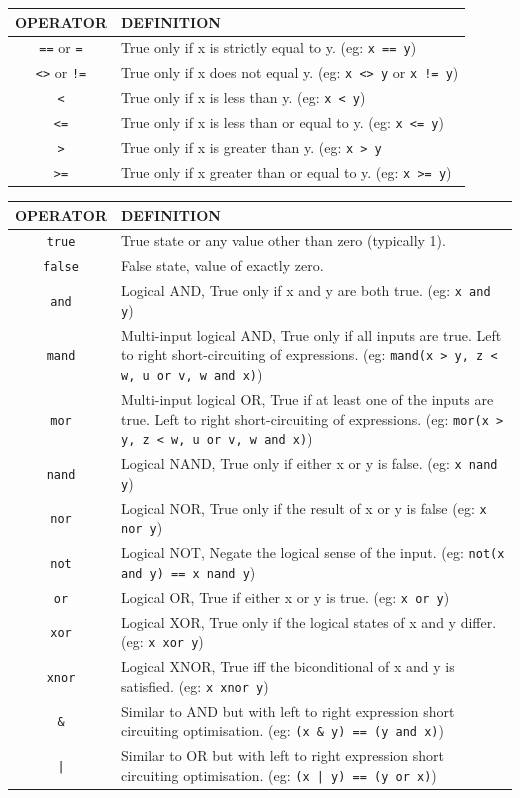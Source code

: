 \documentclass{book}
\def\lthtmlcheckvsize{\ifdim\ht\sizebox<\vsize 
  \ifdim\wd\sizebox<\hsize\expandafter\hfill\fi \expandafter\vfill
  \else\expandafter\vss\fi}%
\begin{document}
{\newpage\clearpage
{}%
\begin{tabular}{|c|p{}|}
\hline
OPERATOR & DEFINITION\\
\hline
\verb'==' or \verb'=' & True only if x is strictly equal to y. (eg: \verb'x == y')\\
\verb'<>' or \verb'!='& True only if x does not equal y. (eg: \verb'x <> y' or \verb'x != y')\\
\verb'<'& True only if x is less than y. (eg: \verb'x < y')\\
\verb'<='& True only if x is less than or equal to y. (eg: \verb'x <= y')\\
\verb'>'& True only if x is greater than y. (eg: \verb'x > y'\\
\verb'>='& True only if x greater than or equal to y. (eg: \verb'x >= y')\\
\hline
\end{tabular}%
\lthtmlfigureZ
\lthtmlcheckvsize\clearpage}

{\newpage\clearpage
{}%
\begin{tabular}{|c|p{}|}
\hline
OPERATOR& DEFINITION\\
\hline
\verb'true'& True state or any value other than zero (typically 1).\\
\verb'false'& False state, value of exactly zero.\\
\verb'and'& Logical AND, True only if x and y are both true. (eg: \verb'x and y')\\
\verb'mand'& Multi-input logical AND, True only if all inputs are true. Left to right short-circuiting of expressions. (eg: \verb'mand(x > y, z < w, u or v, w and x)')\\
\verb'mor'& Multi-input logical OR, True if at least one of the inputs
are true. Left to right short-circuiting of expressions.  (eg:
\verb'mor(x > y, z < w, u or v, w and x)')\\
\verb'nand'& Logical NAND, True only if either x or y is false. (eg: \verb'x nand y')\\
\verb'nor'& Logical NOR, True only if the result of x or y is false (eg: \verb'x nor y')\\
\verb'not'& Logical NOT, Negate the logical sense of the input. (eg: \verb'not(x and y) == x nand y')\\
\verb'or'& Logical OR, True if either x or y is true. (eg: \verb'x or y') \\
\verb'xor'& Logical XOR, True only if the logical states of x and y differ.  (eg: \verb'x xor y')\\
\verb'xnor'& Logical XNOR, True iff the biconditional of x and y is
satisfied.  (eg: \verb'x xnor y')\\
\verb'&'& Similar to AND but with left to right expression short circuiting optimisation.  (eg: \verb'(x & y) == (y and x)')\\
\verb'|'& Similar to OR but with left to right expression short
circuiting optimisation.  (eg: \verb'(x | y) == (y or x)')\\
\hline
\end{tabular}%
\lthtmlfigureZ
\lthtmlcheckvsize\clearpage}
\end{document}
